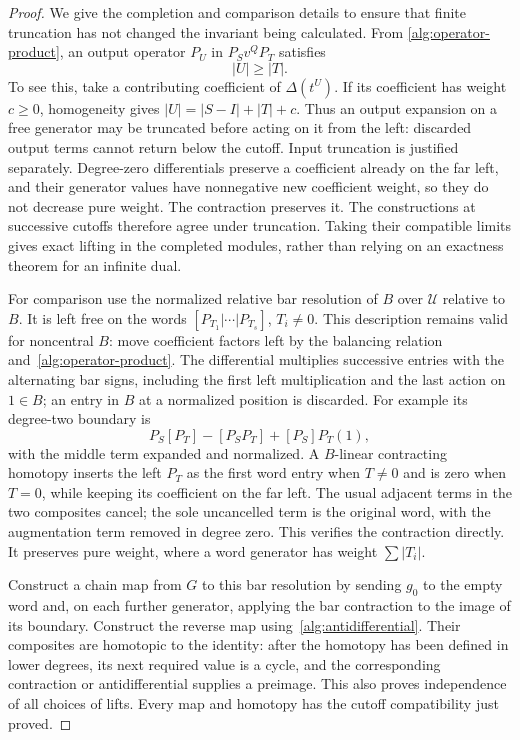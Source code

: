 \documentclass[11pt]{article}
\theoremstyle{definition}
\theoremstyle{remark}
\numberwithin{equation}{section}
\begin{document}
\begin{proof}
We give the completion and comparison details to ensure that finite
truncation has not changed the invariant being calculated.  From
\eqref{alg:operator-product}, an output operator $P_U$ in
$P_Sv^QP_T$ satisfies
\begin{equation}\label{alg:right-weight-bound}
 |U|\geq |T|.
\end{equation}
To see this, take a contributing coefficient of
$\Delta(t^U)$.  If its coefficient has weight $c\geq0$, homogeneity
gives $|U|=|S-I|+|T|+c$.  Thus an output expansion on a free generator
may be truncated before acting on it from the left: discarded output
terms cannot return below the cutoff.  Input truncation is justified
separately.  Degree-zero differentials preserve a coefficient already
on the far left, and their generator values have nonnegative new
coefficient weight, so they do not decrease pure weight.  The
contraction preserves it.  The constructions at successive cutoffs
therefore agree under truncation.  Taking their compatible limits
gives exact lifting in the completed modules, rather than relying on
an exactness theorem for an infinite dual.

For comparison use the normalized relative bar resolution of $B$ over
$\mathcal U$ relative to $B$.  It is left free on the words
$[P_{T_1}|\cdots|P_{T_s}]$, $T_i\ne0$.  This description remains valid
for noncentral $B$: move coefficient factors left by the balancing
relation and~\eqref{alg:operator-product}.  The differential multiplies
successive entries with the alternating bar signs, including the first
left multiplication and the last action on $1\in B$; an entry in $B$
at a normalized position is discarded.  For example its degree-two
boundary is
\[
 P_S[P_T]-[P_SP_T]+[P_S]P_T(1),
\]
with the middle term expanded and normalized.  A $B$-linear contracting
homotopy inserts the left $P_T$ as the first word entry when $T\ne0$
and is zero when $T=0$, while keeping its coefficient on the far left.
The usual adjacent terms in the two composites cancel; the sole
uncancelled term is the original word, with the augmentation term
removed in degree zero.  This verifies the contraction directly.
It preserves pure weight, where a word generator has weight
$\sum|T_i|$.

Construct a chain map from $G$ to this bar resolution by sending $g_0$
to the empty word and, on each further generator, applying the bar
contraction to the image of its boundary.  Construct the reverse map
using~\eqref{alg:antidifferential}.  Their composites are homotopic to
the identity: after the homotopy has been defined in lower degrees,
its next required value is a cycle, and the corresponding contraction
or antidifferential supplies a preimage.  This also proves independence
of all choices of lifts.  Every map and homotopy has the cutoff
compatibility just proved.


\end{proof}
\end{document}
